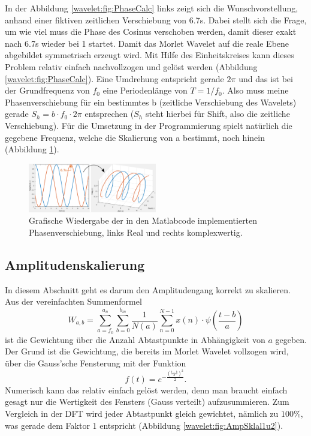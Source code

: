 In der Abbildung \ref{wavelet:fig:PhaseCalc} links zeigt sich die Wunschvorstellung, anhand einer fiktiven zeitlichen Verschiebung von 6.7s. Dabei stellt sich die Frage, um wie viel muss die Phase des Cosinus verschoben werden, damit dieser exakt nach 6.7s wieder bei 1 startet. Damit das Morlet Wavelet auf die reale Ebene abgebildet symmetrisch erzeugt wird.
Mit Hilfe des Einheitskreises kann dieses Problem relativ einfach nachvollzogen und gelöst werden (Abbildung \ref{wavelet:fig:PhaseCalc}). 
Eine Umdrehung entspricht gerade $2\pi$ und das ist bei der Grundfrequenz von $f_0$ eine Periodenlänge von $T=1/f_0$. Also muss meine Phasenverschiebung für ein bestimmtes b (zeitliche Verschiebung des Wavelets) gerade $S_h=b\cdot f_0\cdot 2\pi$ entsprechen ($S_h$ steht hierbei für Shift, also die zeitliche Verschiebung). Für die Umsetzung in der Programmierung spielt natürlich die gegebene Frequenz, welche die Skalierung von a bestimmt, noch hinein (Abbildung \ref{wavelet:fig:PhaseShiftBsp}).

\begin{figure}
	\centering
	\includegraphics[width=0.5\textwidth]{papers/wavelets/images/10-3_PhaseShiftBsp.png}
	\caption{Grafische Wiedergabe der in den Matlabcode implementierten Phasenverschiebung, links Real und rechts komplexwertig.}
	\label{wavelet:fig:PhaseShiftBsp}
\end{figure}

\subsection{Amplitudenskalierung
	\label{wavelets:subsection:Amplitudenskalierung}}
In diesem Abschnitt geht es darum den Amplitudengang korrekt zu skalieren. Aus der vereinfachten Summenformel \[W_{a,b}=\sum_{a=f_0}^{a_n}\sum_{b=0}^{b_m}\frac{1}{N(a)}\sum_{n=0}^{N-1} x(n)\cdot\psi\left(\frac{t-b}{a}\right)\] ist die Gewichtung über die Anzahl Abtastpunkte in Abhängigkeit von $a$ gegeben. Der Grund ist die Gewichtung, die bereits im Morlet Wavelet vollzogen wird, über die Gauss'sche Fensterung mit der Funktion \[f(t)=e^{-\frac{\left(\frac{t-b}{a}\right)^2}{2}}.\]
Numerisch kann das relativ einfach gelöst werden, denn man braucht einfach gesagt nur die Wertigkeit des Fensters (Gauss verteilt) aufzusummieren.
Zum Vergleich in der DFT wird jeder Abtastpunkt gleich gewichtet, nämlich zu $100\%$, was gerade dem Faktor 1 entspricht (Abbildung \ref{wavelet:fig:AmpSklal1u2}).


